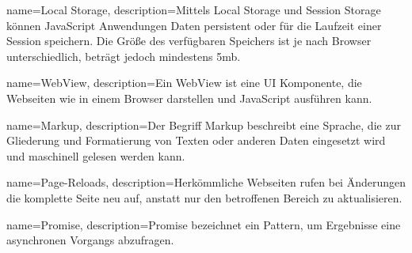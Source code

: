 
{
	name=Local Storage,
	description={Mittels Local Storage und Session Storage können JavaScript Anwendungen Daten persistent oder für die Laufzeit einer Session speichern. Die Größe des verfügbaren Speichers ist je nach Browser unterschiedlich, beträgt jedoch mindestens 5mb.\cite[S. 589ff.]{Flanagan2011}}
}





{
	name=WebView,
	description={Ein WebView ist eine UI Komponente, die Webseiten wie in einem Browser darstellen und JavaScript ausführen kann.}
}






{
	name=Markup,
	description={Der Begriff Markup beschreibt eine Sprache, die zur Gliederung und Formatierung von Texten oder anderen Daten eingesetzt wird und maschinell gelesen werden kann.}
}



{
	name=Page-Reloads,
	description={Herkömmliche Webseiten rufen bei Änderungen die komplette Seite neu auf, anstatt nur den betroffenen Bereich zu aktualisieren.}
}

{
	name=Promise,
	description={Promise bezeichnet ein Pattern, um Ergebnisse eine asynchronen Vorgangs abzufragen.}
}

